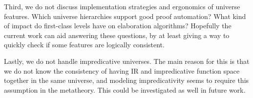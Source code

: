 \documentclass[a4paper,UKenglish,cleveref, autoref, thm-restate]{lipics-v2021}
\theoremstyle{remark}
\theoremstyle{definition}
\begin{document}
Third, we do not discuss implementation strategies and ergonomics of universe
features. Which universe hierarchies support good proof automation? What kind of
impact do first-class levels have on elaboration algorithms? Hopefully the
current work can aid answering these questions, by at least giving a way to quickly
check if some features are logically consistent.

Lastly, we do not handle impredicative universes. The main reason for this is
that we do not know the consistency of having IR and impredicative function
space together in the same universe, and modeling impredicativity seems to
require this assumption in the metatheory. This could be investigated as well
in future work.


\end{document}
